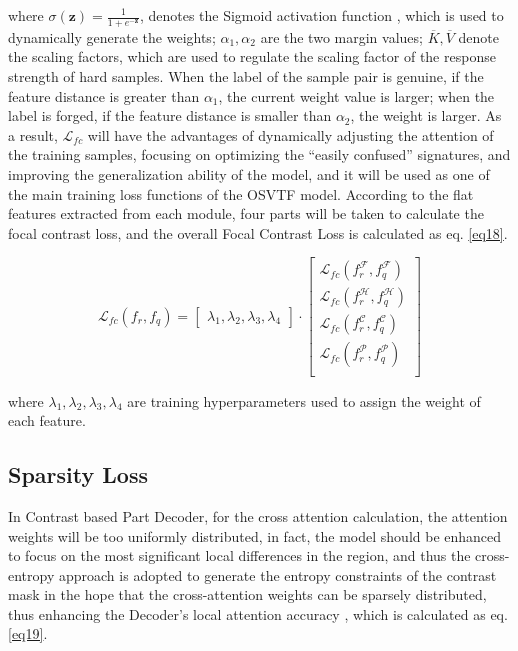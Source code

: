 where $\sigma(\boldsymbol{z})=\frac{1}{1+e^{-\boldsymbol{z}}}$, denotes the Sigmoid activation function \cite{26}, which is used to dynamically generate the weights; $\alpha_1,\alpha_2$ are the two margin values; $\overline{K},\overline{V}$ denote the scaling factors, which are used to regulate the scaling factor of the response strength of hard samples. When the label of the sample pair is genuine, if the feature distance is greater than $\alpha_1$, the current weight value is larger; when the label is forged, if the feature distance is smaller than $\alpha_2$, the weight is larger. As a result, $\mathcal{L}_{fc}$ will have the advantages of dynamically adjusting the attention of the training samples, focusing on optimizing the “easily confused” signatures, and improving the generalization ability of the model, and it will be used as one of the main training loss functions of the OSVTF model. According to the flat features extracted from each module, four parts will be taken to calculate the focal contrast loss, and the overall Focal Contrast Loss is calculated as eq. \ref{eq18}.

\begin{equation}
\label{eq18}
  \mathcal{L}_{fc}(f_r,f_q )=
  \begin{bmatrix}
  \lambda_1, \lambda_2, \lambda_3, \lambda_4
  \end{bmatrix} 
  \cdot
  \begin{bmatrix}
  \mathcal{L}_{fc} (f_r^\mathcal{F},f_q^\mathcal{F}) \\
  \mathcal{L}_{fc} (f_r^\mathcal{H},f_q^\mathcal{H}) \\
  \mathcal{L}_{fc} (f_r^\mathcal{C},f_q^\mathcal{C}) \\
  \mathcal{L}_{fc} (f_r^\mathcal{P},f_q^\mathcal{P}) \\
  \end{bmatrix}
\end{equation}

where $\lambda_1,\lambda_2,\lambda_3,\lambda_4$ are training hyperparameters used to assign the weight of each feature.

\subsection{Sparsity Loss}

In Contrast based Part Decoder, for the cross attention calculation, the attention weights will be too uniformly distributed, in fact, the model should be enhanced to focus on the most significant local differences in the region, and thus the cross-entropy approach is adopted to generate the entropy constraints of the contrast mask in the hope that the cross-attention weights can be sparsely distributed, thus enhancing the Decoder's local attention accuracy \cite{41}, which is calculated as eq. \ref{eq19}.

